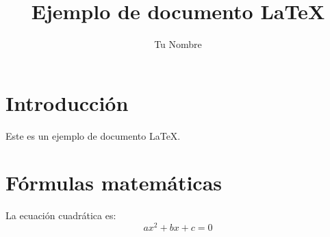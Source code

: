 \documentclass{article}
\begin{document}
\title{Ejemplo de documento LaTeX}
\author{Tu Nombre}
\maketitle

\section{Introducción}
Este es un ejemplo de documento LaTeX.

\section{Fórmulas matemáticas}
La ecuación cuadrática es:
\[
ax^2 + bx + c = 0
\]
\end{document}

